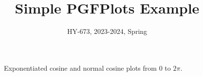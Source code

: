 \documentclass{article}
\title{Simple PGFPlots Example}
\author{HY-673, 2023-2024, Spring}
\date{}
\begin{document}
	
\maketitle

\begin{figure}[h]
	\centering
	
	\caption{Exponentiated cosine and normal cosine plots from $0$ to $2\pi$.}
	\label{fig:fig1}
\end{figure}
\end{document}

